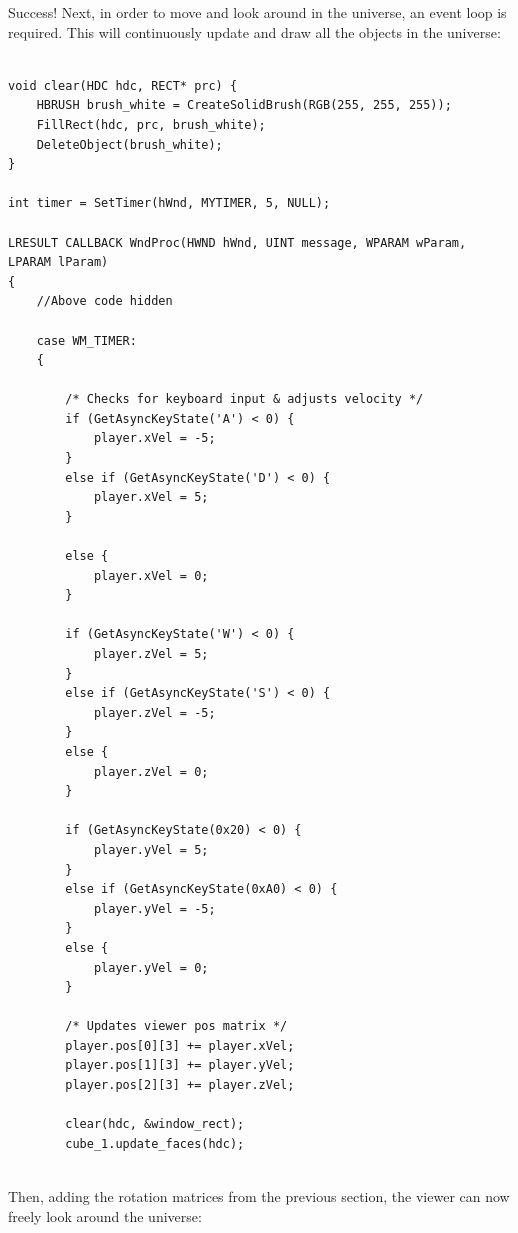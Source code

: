 \documentclass{article}
\begin{document}
Success! Next, in order to move and look around in the universe, an event loop is required. This will continuously update and draw all the objects in the universe:

\begin{lstlisting}

void clear(HDC hdc, RECT* prc) {
	HBRUSH brush_white = CreateSolidBrush(RGB(255, 255, 255));
	FillRect(hdc, prc, brush_white);
	DeleteObject(brush_white);
}

int timer = SetTimer(hWnd, MYTIMER, 5, NULL);

LRESULT CALLBACK WndProc(HWND hWnd, UINT message, WPARAM wParam, LPARAM lParam)
{
	//Above code hidden
	
	case WM_TIMER:
	{
	
		/* Checks for keyboard input & adjusts velocity */
		if (GetAsyncKeyState('A') < 0) {
			player.xVel = -5;
		}
		else if (GetAsyncKeyState('D') < 0) {
			player.xVel = 5;
		}
		
		else {
			player.xVel = 0;
		}

		if (GetAsyncKeyState('W') < 0) {
			player.zVel = 5;
		}
		else if (GetAsyncKeyState('S') < 0) {
			player.zVel = -5;
		}
		else {
			player.zVel = 0;
		}

		if (GetAsyncKeyState(0x20) < 0) {
			player.yVel = 5;
		}
		else if (GetAsyncKeyState(0xA0) < 0) {
			player.yVel = -5;
		}
		else {
			player.yVel = 0;
		}
		
		/* Updates viewer pos matrix */
		player.pos[0][3] += player.xVel;
		player.pos[1][3] += player.yVel;
		player.pos[2][3] += player.zVel;
		
		clear(hdc, &window_rect);
		cube_1.update_faces(hdc);
		
\end{lstlisting}
Then, adding the rotation matrices from the previous section, the viewer can now freely look around the universe:
\end{document}
